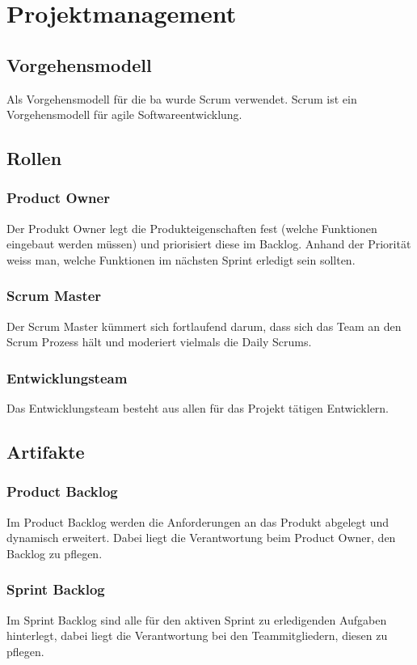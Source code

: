 \chapter{Projektmanagement}

\section{Vorgehensmodell}

Als Vorgehensmodell für die \acl{ba} wurde Scrum\cite{Scrum} verwendet.
Scrum ist ein Vorgehensmodell für agile Softwareentwicklung. 

\section{Rollen}

\subsection{Product Owner}
Der Produkt Owner legt die Produkteigenschaften fest (welche Funktionen eingebaut werden müssen) 
und priorisiert diese im Backlog. Anhand der Priorität weiss man, welche 
Funktionen im nächsten Sprint erledigt sein sollten.

\subsection{Scrum Master}
Der Scrum Master kümmert sich fortlaufend darum, dass sich das Team an den Scrum 
Prozess hält und moderiert vielmals die Daily Scrums.

\subsection{Entwicklungsteam}
Das Entwicklungsteam besteht aus allen für das Projekt tätigen Entwicklern.

\section{Artifakte}

\subsection{Product Backlog}
Im Product Backlog werden die Anforderungen an das Produkt abgelegt und 
dynamisch erweitert. Dabei liegt die Verantwortung beim Product Owner, den 
Backlog zu pflegen.

\subsection{Sprint Backlog}
Im Sprint Backlog sind alle für den aktiven Sprint zu erledigenden Aufgaben 
hinterlegt, dabei liegt die Verantwortung bei den Teammitgliedern, diesen zu 
pflegen.

